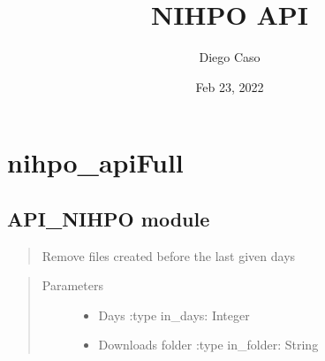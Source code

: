 \documentclass[letterpaper,10pt,english]{sphinxmanual}
\title{NIHPO API}
\date{Feb 23, 2022}
\author{Diego Caso}
\begin{document}
\pagestyle{empty}
\sphinxmaketitle
\pagestyle{plain}
\sphinxtableofcontents
\pagestyle{normal}
\label{\detokenize{index::doc}}



\chapter{nihpo\_apiFull}
\label{\detokenize{modules:nihpo-apifull}}\label{\detokenize{modules::doc}}

\section{API\_NIHPO module}
\label{\detokenize{API_NIHPO:module-API_NIHPO}}\label{\detokenize{API_NIHPO:api-nihpo-module}}\label{\detokenize{API_NIHPO::doc}}

\begin{fulllineitems}
\label{\detokenize{API_NIHPO:API_NIHPO.func_nihpo_remove_old_files}}\begin{quote}

\sphinxAtStartPar
Remove files created before the last given days
\end{quote}
\begin{quote}\begin{description}
\item[{Parameters}] \leavevmode\begin{itemize}
\item {} 
\sphinxAtStartPar
{} \textendash{} Days
:type in\_days: Integer

\item {} 
\sphinxAtStartPar
{} \textendash{} Downloads folder
:type in\_folder: String

\end{itemize}

\end{description}\end{quote}

\end{fulllineitems}
\end{document}
